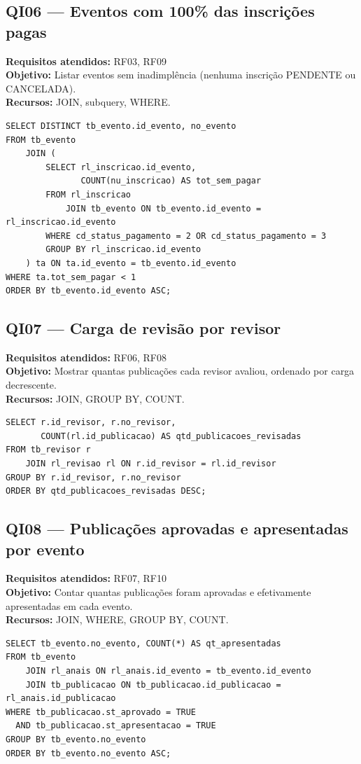 \documentclass[12pt]{article}
\begin{document}
\subsection{QI06 --- Eventos com 100\% das inscrições pagas}
\textbf{Requisitos atendidos:} RF03, RF09 \\
\textbf{Objetivo:} Listar eventos sem inadimplência (nenhuma inscrição PENDENTE ou CANCELADA).\\
\textbf{Recursos:} JOIN, subquery, WHERE.
\begin{lstlisting}[caption={QI06 -- Eventos com todas as inscrições CONCLUIDO.}]
SELECT DISTINCT tb_evento.id_evento, no_evento
FROM tb_evento
    JOIN (
        SELECT rl_inscricao.id_evento,
               COUNT(nu_inscricao) AS tot_sem_pagar
        FROM rl_inscricao
            JOIN tb_evento ON tb_evento.id_evento = rl_inscricao.id_evento
        WHERE cd_status_pagamento = 2 OR cd_status_pagamento = 3
        GROUP BY rl_inscricao.id_evento
    ) ta ON ta.id_evento = tb_evento.id_evento
WHERE ta.tot_sem_pagar < 1
ORDER BY tb_evento.id_evento ASC;
\end{lstlisting}

\subsection{QI07 --- Carga de revisão por revisor}
\textbf{Requisitos atendidos:} RF06, RF08 \\
\textbf{Objetivo:} Mostrar quantas publicações cada revisor avaliou, ordenado por carga decrescente.\\
\textbf{Recursos:} JOIN, GROUP BY, COUNT.
\begin{lstlisting}[caption={QI07 -- Carga de revisão por revisor.}]
SELECT r.id_revisor, r.no_revisor,
       COUNT(rl.id_publicacao) AS qtd_publicacoes_revisadas
FROM tb_revisor r
    JOIN rl_revisao rl ON r.id_revisor = rl.id_revisor
GROUP BY r.id_revisor, r.no_revisor
ORDER BY qtd_publicacoes_revisadas DESC;
\end{lstlisting}

\subsection{QI08 --- Publicações aprovadas e apresentadas por evento}
\textbf{Requisitos atendidos:} RF07, RF10 \\
\textbf{Objetivo:} Contar quantas publicações foram aprovadas e efetivamente apresentadas em cada evento.\\
\textbf{Recursos:} JOIN, WHERE, GROUP BY, COUNT.
\begin{lstlisting}[caption={QI08 -- Aprovadas e apresentadas por evento.}]
SELECT tb_evento.no_evento, COUNT(*) AS qt_apresentadas
FROM tb_evento
    JOIN rl_anais ON rl_anais.id_evento = tb_evento.id_evento
    JOIN tb_publicacao ON tb_publicacao.id_publicacao = rl_anais.id_publicacao
WHERE tb_publicacao.st_aprovado = TRUE
  AND tb_publicacao.st_apresentacao = TRUE
GROUP BY tb_evento.no_evento
ORDER BY tb_evento.no_evento ASC;
\end{lstlisting}
\end{document}
